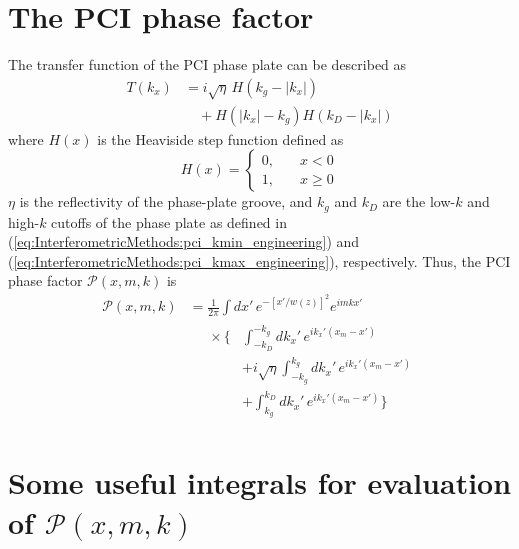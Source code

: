 \section{The PCI phase factor}
The transfer function of the PCI phase plate can be described as
\begin{equation}
  \begin{aligned}
    T(k_x)
    &=
    i \sqrt{\eta} \, H(k_g - |k_x|)
    \\
    &\quad +
    H(|k_x| - k_g)
    H(k_D - |k_x|)
  \end{aligned}
  \label{eq:PCIResponseIdentities:phase_plate_transfer_function}
\end{equation}
where $H(x)$ is the Heaviside step function defined as
\begin{equation}
  H(x)
  =
  \begin{cases}
    0, \quad &x < 0 \\
    1, \quad &x \geq 0
  \end{cases}
  \label{eq:PCIResponseIdentities:Heaviside_step_function}
\end{equation}
$\eta$ is the reflectivity of the phase-plate groove, and
$k_g$ and $k_D$ are the low-$k$ and high-$k$ cutoffs of the phase plate
as defined in
(\ref{eq:InterferometricMethods:pci_kmin_engineering}) and
(\ref{eq:InterferometricMethods:pci_kmax_engineering}), respectively.
Thus, the PCI phase factor $\mathcal{P}(x, m, k)$ is
\begin{equation}
  \begin{aligned}
    \mathcal{P}(x, m, k)
    &=
    \frac{1}{2 \pi}
    \int dx' \,
    e^{-\left[ x' / w(z) \right]^2}
    e^{i m k x'}
    \\
    &\begin{aligned}
      \quad
      \times
      \Biggl\{%
        &\int_{-k_D}^{-k_g} dk_x' \,
        e^{i k_x' (x_m - x')}
        \\
        &+
        i \sqrt{\eta}
        \int_{-k_g}^{k_g} dk_x' \,
        e^{i k_x' (x_m - x')}
        \\
        &+
        \int_{k_g}^{k_D} dk_x' \,
        e^{i k_x' (x_m - x')}
      \Biggr\}
    \end{aligned}
  \end{aligned}
  \label{eq:PCIResponseIdentities:mth_diffracted_beam_kx_filtered_phase_factor_near_field_integrals}
\end{equation}


\section{Some useful integrals for evaluation of $\mathcal{P}(x, m, k)$}


